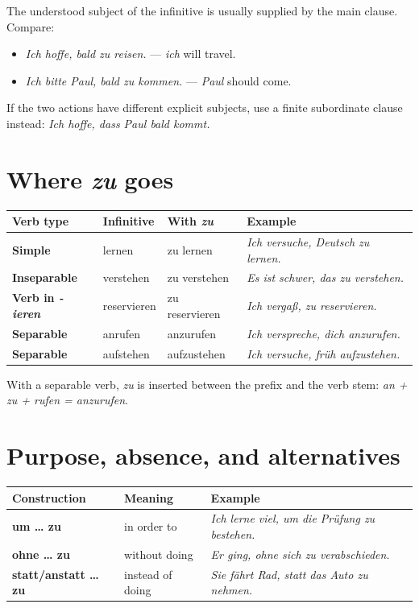 The understood subject of the infinitive is usually supplied by the main
clause. Compare:

\begin{itemize}[leftmargin=*]
  \item \textit{Ich hoffe, bald zu reisen.} --- \textit{ich} will travel.
  \item \textit{Ich bitte Paul, bald zu kommen.} --- \textit{Paul} should come.
\end{itemize}

If the two actions have different explicit subjects, use a finite subordinate
clause instead: \textit{Ich hoffe, dass Paul bald kommt.}

\section{Where \textit{zu} goes}

\begin{center}
\small
{}
\begin{tabularx}{\textwidth}{@{}>{\bfseries}l l l X@{}}
\toprule
Verb type & Infinitive & With \textit{zu} & Example \\
\midrule
Simple & lernen & zu lernen & \textit{Ich versuche, Deutsch zu lernen.} \\
Inseparable & verstehen & zu verstehen & \textit{Es ist schwer, das zu verstehen.} \\
Verb in \textit{-ieren} & reservieren & zu reservieren & \textit{Ich vergaß, zu reservieren.} \\
Separable & anrufen & anzurufen & \textit{Ich verspreche, dich anzurufen.} \\
Separable & aufstehen & aufzustehen & \textit{Ich versuche, früh aufzustehen.} \\
\bottomrule
\end{tabularx}
\end{center}

With a separable verb, \textit{zu} is inserted between the prefix and the verb
stem: \textit{an + zu + rufen = anzurufen}.

\section{Purpose, absence, and alternatives}

\begin{center}
\small
{}
\begin{tabularx}{\textwidth}{@{}>{\bfseries}l l X@{}}
\toprule
Construction & Meaning & Example \\
\midrule
um \ldots{} zu & in order to & \textit{Ich lerne viel, um die Prüfung zu bestehen.} \\
ohne \ldots{} zu & without doing & \textit{Er ging, ohne sich zu verabschieden.} \\
statt/anstatt \ldots{} zu & instead of doing
  & \textit{Sie fährt Rad, statt das Auto zu nehmen.} \\
\bottomrule
\end{tabularx}
\end{center}


